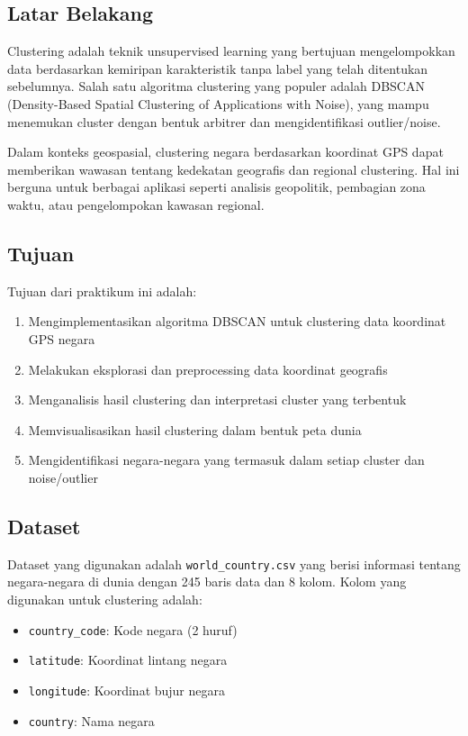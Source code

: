\documentclass[12pt,a4paper]{article}
\begin{document}
\subsection{Latar Belakang}
Clustering adalah teknik unsupervised learning yang bertujuan mengelompokkan data berdasarkan kemiripan karakteristik tanpa label yang telah ditentukan sebelumnya. Salah satu algoritma clustering yang populer adalah DBSCAN (Density-Based Spatial Clustering of Applications with Noise), yang mampu menemukan cluster dengan bentuk arbitrer dan mengidentifikasi outlier/noise.

Dalam konteks geospasial, clustering negara berdasarkan koordinat GPS dapat memberikan wawasan tentang kedekatan geografis dan regional clustering. Hal ini berguna untuk berbagai aplikasi seperti analisis geopolitik, pembagian zona waktu, atau pengelompokan kawasan regional.

\subsection{Tujuan}
Tujuan dari praktikum ini adalah:
\begin{enumerate}
    \item Mengimplementasikan algoritma DBSCAN untuk clustering data koordinat GPS negara
    \item Melakukan eksplorasi dan preprocessing data koordinat geografis
    \item Menganalisis hasil clustering dan interpretasi cluster yang terbentuk
    \item Memvisualisasikan hasil clustering dalam bentuk peta dunia
    \item Mengidentifikasi negara-negara yang termasuk dalam setiap cluster dan noise/outlier
\end{enumerate}

\subsection{Dataset}
Dataset yang digunakan adalah \texttt{world\_country.csv} yang berisi informasi tentang negara-negara di dunia dengan 245 baris data dan 8 kolom. Kolom yang digunakan untuk clustering adalah:
\begin{itemize}
    \item \texttt{country\_code}: Kode negara (2 huruf)
    \item \texttt{latitude}: Koordinat lintang negara
    \item \texttt{longitude}: Koordinat bujur negara
    \item \texttt{country}: Nama negara
\end{itemize}
\end{document}
